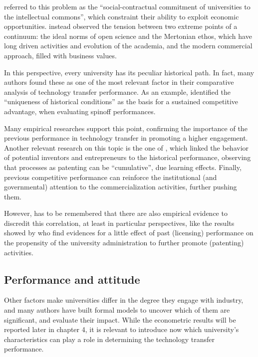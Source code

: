 \citet{Argyres1998} referred to this problem as the \enquote{social-contractual commitment of universities to the intellectual commons}, which constraint their ability to exploit economic opportunities. \citet{Muscio2013} instead observed the tension between two extreme points of a continuum: the ideal norms of open science and the Mertonian ethos, which have long driven activities and evolution of the academia, and the modern commercial approach, filled with business values.

In this perspective, every university has its peculiar historical path. In fact, many authors found these as one of the most relevant factor in their comparative analysis of technology transfer performance. As an example, \citet{OShea2005} identified the \enquote{uniqueness of historical conditions} as the basis for a sustained competitive advantage, when evaluating spinoff performances. 

Many empirical researches support this point, confirming the importance of the previous performance in technology transfer in promoting a higher engagement. Another relevant research on this topic is the one of \citet{Baldini2006}, which linked the behavior of potential inventors and entrepreneurs to the historical performance, observing that processes as patenting can be \enquote{cumulative}, due learning effects. Finally, previous competitive performance can reinforce the institutional (and governmental) attention to the commercialization activities, further pushing them.

However, has to be remembered that there are also empirical evidence to discredit this correlation, at least in particular perspectives, like the results showed by \citet{Thursby2002} who find evidences for a little effect of past (licensing) performance on the propensity of the university administration to further promote (patenting) activities.


\subsection{Performance and attitude}

Other factors make universities differ in the degree they engage with industry, and many authors have built formal models to uncover which of them are significant, and evaluate their impact. While the econometric results will be reported later in chapter 4, it is relevant to introduce now which university's characteristics can play a role in determining the technology transfer performance.

